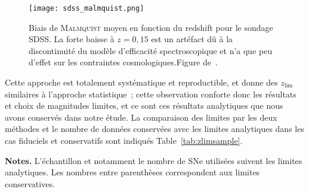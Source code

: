 \documentclass[../main/main.tex]{subfiles}
\begin{document}
\begin{SCfigure}[0.7][ht!]
    \centering
    \texttt{[image: sdss\_malmquist.png]}
    \caption[Biais de \textsc{Malmquist} moyen en fonction du redshift pour le
    sondage SDSS]{Biais de \textsc{Malmquist} moyen en fonction du redshift
        pour le sondage SDSS. La forte baisse à $z=0,15$ est un artéfact dû à la
        discontinuité du modèle d'efficacité spectroscopique et n'a que peu
        d'effet sur les contraintes cosmologiques.\smallbreak Figure
    de~\cite{conley2011}.}
    \label{fig:sdssmalm}
\end{SCfigure}

Cette approche est totalement systématique et reproductible, et donne des
$z_{\lim}$ similaires à l'approche statistique~; cette observation conforte donc
les résultats et choix de magnitudes limites, et ce sont ces résultats
analytiques que nous avons conservés dans notre étude. La comparaison des
limites par les deux méthodes et le nombre de données conservées avec les
limites analytiques dans les cas fiduciels et conservatifs sont indiqués
Table~\ref{tab:zlimsample}.

\begin{table}[ht]
    \centering
        \caption{Composition en SNe~Ia de notre échantillon.}
        \label{tab:zlimsample}
    \begin{threeparttable}
        \begin{tablenotes}[flushleft]
        \item\small \textbf{\hspace{-3,2pt}Notes.} L'échantillon et notamment le
            nombre de SNe utilisées suivent les limites analytiques. Les nombres
            entre parenthèses correspondent aux limites conservatives.
        \end{tablenotes}
    \end{threeparttable}
\end{table}
\end{document}
